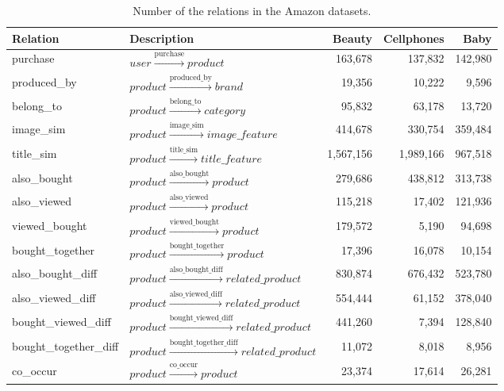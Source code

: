 \documentclass[10pt,journal,compsoc]{IEEEtran}
\begin{document}
\begin{table}[h]
\centering
\caption{Number of the relations in the Amazon datasets.}
\begin{tabular}{llrrr}
     \hline
     Relation & Description & Beauty & Cellphones & Baby\\
     \hline
     purchase &  $user\xrightarrow{\text{purchase}} product$ & 163,678&137,832 &142,980\\
     produced\_by & $product \xrightarrow{\text{produced\_by}} brand$ &19,356 &10,222 &9,596 \\
     belong\_to & $product \xrightarrow{\text{belong\_to}} category$& 95,832 &63,178  &13,720\\
     image\_sim & $product \xrightarrow{\text{image\_sim}} image\_feature$ & 414,678 & 330,754 &359,484\\
     title\_sim & $product \xrightarrow{\text{title\_sim}} title\_feature$ &  1,567,156& 1,989,166 &967,518\\
     also\_bought & $product \xrightarrow{\text{also\_bought}} product$& 279,686 &438,812 &313,738\\
     also\_viewed & $product \xrightarrow{\text{also\_viewed}} product$& 115,218 & 17,402 &121,936\\
     viewed\_bought & $product \xrightarrow{\text{viewed\_bought}} product$&179,572& 5,190&94,698\\
     bought\_together & $product \xrightarrow{\text{bought\_together}} product$& 17,396 & 16,078 &10,154\\
     also\_bought\_diff & $product \xrightarrow{\text{also\_bought\_diff}} related\_product$& 830,874  & 676,432 &523,780\\
     also\_viewed\_diff & $product \xrightarrow{\text{also\_viewed\_diff}} related\_product$& 554,444 & 61,152 &378,040\\
     bought\_viewed\_diff& $product \xrightarrow{\text{bought\_viewed\_diff}} related\_product$& 441,260  &7,394 &128,840\\
     bought\_together\_diff& $product \xrightarrow{\text{bought\_together\_diff}} related\_product$& 11,072 &8,018 &8,956\\
     co\_occur& $product \xrightarrow{\text{co\_occur}} product$& 23,374 &  17,614 &26,281\\
     \hline
\end{tabular}
\label{table1}
\end{table}
\end{document}
